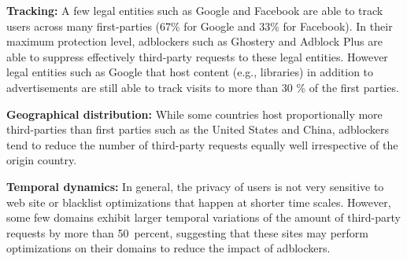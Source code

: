 \documentclass[compsoc, conference, letterpaper, 10pt, times]{IEEEtran}
\begin{document}
\vspace{0.5 em}\noindent \textbf{Tracking:}
A few legal entities such as Google and Facebook are able to track users across many first-parties (67\% for Google and 33\% for Facebook). In their maximum protection level, adblockers such as Ghostery and Adblock Plus are able to suppress effectively third-party requests to these legal entities. However legal entities such as Google that host content (e.g., libraries) in addition to advertisements are still able to track visits to more than 30 \% of the first parties.  

\vspace{0.5 em}\noindent \textbf{Geographical distribution:}
While some countries host proportionally more third-parties than first parties such as the United States and China, adblockers tend to reduce the number of third-party requests equally well irrespective of the origin country. 

\vspace{0.5 em}\noindent \textbf{Temporal dynamics:} In general, the privacy of users is not very sensitive to web site or blacklist optimizations that happen at shorter time scales. However, some few domains exhibit larger temporal variations of the amount of third-party requests by more than 50~percent, suggesting that these sites may perform optimizations on their domains to reduce the impact of adblockers.






\end{document}

